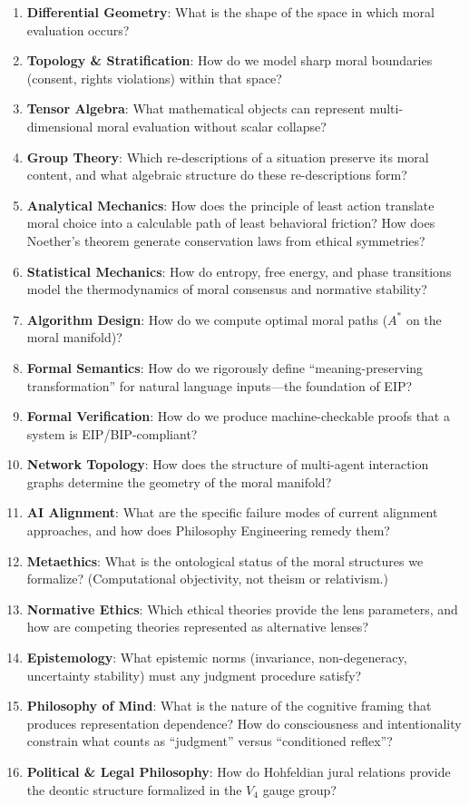 \documentclass[12pt,letterpaper]{article}
\theoremstyle{definition}
\theoremstyle{plain}
\begin{document}
\begin{enumerate}
    \item \textbf{Differential Geometry}: What is the shape of the space in which moral evaluation occurs?
    \item \textbf{Topology \& Stratification}: How do we model sharp moral boundaries (consent, rights violations) within that space?
    \item \textbf{Tensor Algebra}: What mathematical objects can represent multi-dimensional moral evaluation without scalar collapse?
    \item \textbf{Group Theory}: Which re-descriptions of a situation preserve its moral content, and what algebraic structure do these re-descriptions form?
    \item \textbf{Analytical Mechanics}: How does the principle of least action translate moral choice into a calculable path of least behavioral friction? How does Noether's theorem generate conservation laws from ethical symmetries?
    \item \textbf{Statistical Mechanics}: How do entropy, free energy, and phase transitions model the thermodynamics of moral consensus and normative stability?
    \item \textbf{Algorithm Design}: How do we compute optimal moral paths ($A^*$ on the moral manifold)?
    \item \textbf{Formal Semantics}: How do we rigorously define ``meaning-preserving transformation'' for natural language inputs---the foundation of EIP?
    \item \textbf{Formal Verification}: How do we produce machine-checkable proofs that a system is EIP/BIP-compliant?
    \item \textbf{Network Topology}: How does the structure of multi-agent interaction graphs determine the geometry of the moral manifold?
    \item \textbf{AI Alignment}: What are the specific failure modes of current alignment approaches, and how does Philosophy Engineering remedy them?
    \item \textbf{Metaethics}: What is the ontological status of the moral structures we formalize? (Computational objectivity, not theism or relativism.)
    \item \textbf{Normative Ethics}: Which ethical theories provide the lens parameters, and how are competing theories represented as alternative lenses?
    \item \textbf{Epistemology}: What epistemic norms (invariance, non-degeneracy, uncertainty stability) must any judgment procedure satisfy?
    \item \textbf{Philosophy of Mind}: What is the nature of the cognitive framing that produces representation dependence? How do consciousness and intentionality constrain what counts as ``judgment'' versus ``conditioned reflex''?
    \item \textbf{Political \& Legal Philosophy}: How do Hohfeldian jural relations provide the deontic structure formalized in the $V_4$ gauge group?
\end{enumerate}
\end{document}
